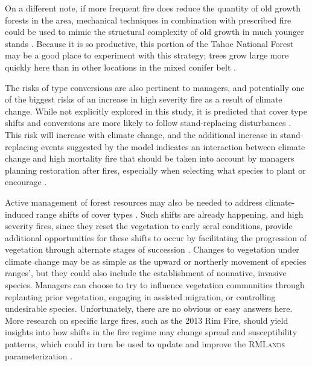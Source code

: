 On a different note, if more frequent fire does reduce the quantity of old growth forests in the area, mechanical techniques in combination with prescribed fire could be used to mimic the structural complexity of old growth in much younger stands \citep{Franklin2002}. Because it is so productive, this portion of the Tahoe National Forest may be a good place to experiment with this strategy; trees grow large more quickly here than in other locations in the mixed conifer belt \citep{PRISMClimateGroup2004,Littell2012}.

The risks of type conversions are also pertinent to managers, and potentially one of the biggest risks of an increase in high severity fire as a result of climate change. While not explicitly explored in this study, it is predicted that cover type shifts and conversions are more likely to follow stand-replacing disturbances \citep{Stephens2013}. This risk will increase with climate change, and the additional increase in stand-replacing events suggested by the model indicates an interaction between climate change and high mortality fire that should be taken into account by managers planning restoration after fires, especially when selecting what species to plant or encourage \citep{Fule2008,Schwartz2015}. 

Active management of forest resources may also be needed to address climate-induced range shifts of cover types \citep{Keane2009}. Such shifts are already happening, and high severity fires, since they reset the vegetation to early seral conditions, provide additional opportunities for these shifts to occur by facilitating the progression of vegetation through alternate stages of succession \citep{Bachelet2001}. Changes to vegetation under climate change may be as simple as the upward or northerly movement of species ranges’, but they could also include the establishment of nonnative, invasive species. Managers can choose to try to influence vegetation communities through replanting prior vegetation, engaging in assisted migration, or controlling undesirable species. Unfortunately, there are no obvious or easy answers here. More research on specific large fires, such as the 2013 Rim Fire, should yield insights into how shifts in the fire regime may change spread and susceptibility patterns, which could in turn be used to update and improve the \textsc{RMLands} parameterization \citep{Lydersen2014}.




